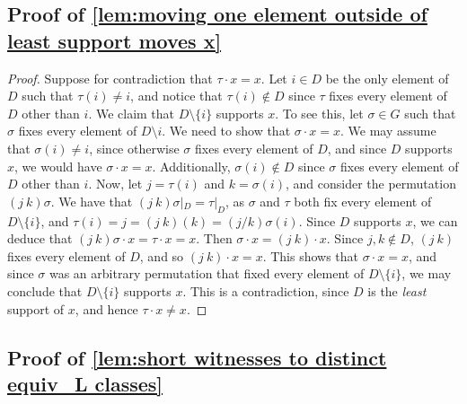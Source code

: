 \documentclass[11pt,a4paper]{amsart}
\theoremstyle{definition}
\begin{document}
\subsection{Proof of \autoref{lem:moving one element outside of least support moves x}} \label{appendix:proof of moving one element outside of least support moves x}


\begin{proof}
    Suppose for contradiction that $\tau \cdot x = x$. 
    Let $i \in D$ be the only element of $D$ such that $\tau(i) \neq i$, and notice that $\tau(i) \notin D$ since $\tau$ fixes every element of $D$ other than $i$.
    We claim that $D \setminus \{i\}$ supports $x$. 
    To see this, let $\sigma \in G$ such that $\sigma$ fixes every element of $D \setminus i$. 
    We need to show that $\sigma \cdot x = x$.
    We may assume that $\sigma(i) \neq i$, since otherwise $\sigma$ fixes every element of $D$, and since $D$ supports $x$, we would have $\sigma \cdot x = x$. 
    Additionally, $\sigma(i) \notin D$ since $\sigma$ fixes every element of $D$ other than $i$. 
    Now, let $j = \tau(i)$ and $k = \sigma(i)$, and consider the permutation $(j \ k) \sigma$. 
    We have that $(j \ k) \sigma|_D = \tau|_D$, as $\sigma$ and $\tau$ both fix every element of $D \setminus \{i\}$, and $\tau(i) = j = (j \ k)(k) = (j / k)\sigma(i)$. 
    Since $D$ supports $x$, we can deduce that $(j \ k) \sigma \cdot x = \tau \cdot x = x$. 
    Then $\sigma \cdot x = (j \ k) \cdot x$. 
    Since $j,k \notin D$, $(j \ k)$ fixes every element of $D$, and so $(j \ k) \cdot x = x$. 
    This shows that $\sigma \cdot x = x$, and since $\sigma$ was an arbitrary permutation that fixed every element of $D \setminus \{i\}$, we may conclude that $D \setminus \{i\}$ supports $x$.
    This is a contradiction, since $D$ is the \textit{least} support of $x$, and hence $\tau \cdot x \neq x$.
\end{proof}




\subsection{Proof of \autoref{lem:short witnesses to distinct equiv_L classes}} \label{appendix:proof of short witnesses to distinct equiv_L classes}
\end{document}
